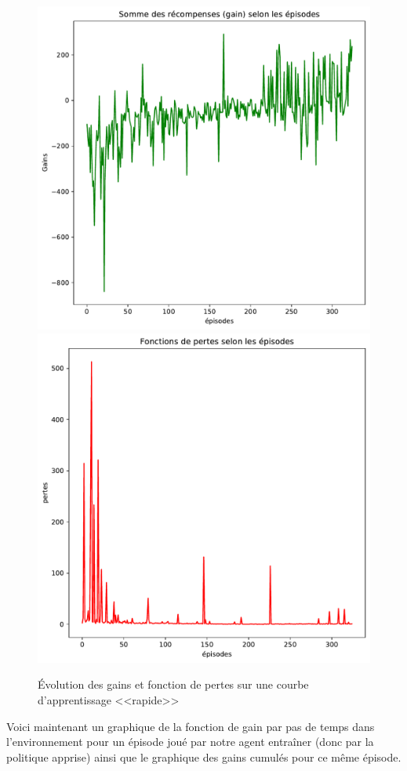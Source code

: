\documentclass[letterpaper,11pt]{article}
\begin{document}
\begin{enumerate}[label=(\alph*)]
\begin{center}
\begin{figure}[H]
\caption{Évolution des gains et fonction de pertes sur une courbe d'apprentissage <<rapide>>}\label{figure rapide}
\includegraphics[width=0.45\linewidth]{gains_convergence_rapide.pdf} \hfill \includegraphics[width=0.45\linewidth]{pertes_convergence_rapide.pdf}
\end{figure}
\end{center}

\vspace*{-1.5cm}
Voici maintenant un graphique de la fonction de gain par pas de temps dans l'environnement pour un épisode joué par notre agent entraîner (donc par la politique apprise) ainsi que le graphique des gains cumulés pour ce même épisode.
 

\end{enumerate}
\end{document}
